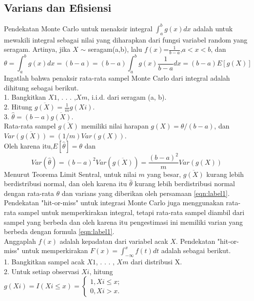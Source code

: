 \documentclass[a4paper,12pt]{article}
\theoremstyle{definition}
\begin{document}
\subsection{Varians dan Efisiensi}
Pendekatan Monte Carlo untuk menaksir integral $\int_{a}^{b}g(x)dx$ adalah untuk mewakili integral sebagai nilai yang diharapkan dari fungsi variabel random yang seragam.
Artinya, jika $X$ $\sim$ seragam(a,b), lalu $f(x)$=$\frac{1}{b-a}$,$a<x<b$, dan
\begin{equation}
    \theta=\int_{a}^{b}g(x)dx
    =(b-a)=(b-a)\int_{a}^{b}g(x)\frac{1}{b-a}dx=(b-a)E[g(X)]
\end{equation}
Ingatlah bahwa penaksir rata-rata sampel Monte Carlo dari integral adalah
dihitung sebagai berikut.\\
1. Bangkitkan $X1$, . . . ,$Xm$, i.i.d. dari seragam (a, b).\\
2. Hitung $\overline{g(X)}=\frac{1}{m}g(Xi)$.\\
3. $\hat{\theta}=(b-a)\overline{g(X)}$.\\
Rata-rata sampel $\overline{g(X)}$ memiliki nilai harapan $g(X)=\theta/(b-a)$, dan ${Var}\overline{(g(X))}=(1/m){Var}(g(X))$.\\
Oleh karena itu,$E[{\hat{\theta}}]=\theta$ dan
\begin{equation}
{Var(\hat{\theta})}=(b-a)^2{Var(\overline{g(X)})}=\frac{(b-a)^2}{m}{Var(g(X))}
\label{eqn:label1}
\end{equation}
Menurut Teorema Limit Sentral, untuk nilai $m$ yang besar, $\overline{g(X)}$ kurang lebih berdistribusi normal, dan oleh karena itu $\hat{\theta}$ kurang lebih berdistribusi normal dengan rata-rata $\theta$ dan varians yang diberikan oleh persamaan \eqref{eqn:label1}.\\
Pendekatan "hit-or-miss" untuk integrasi Monte Carlo juga menggunakan rata-rata sampel untuk memperkirakan integral, tetapi rata-rata sampel diambil dari sampel yang berbeda dan oleh karena itu pengestimasi ini memiliki varian yang berbeda dengan formula \eqref{eqn:label1}.\\
Anggaplah $f(x)$ adalah kepadatan dari variabel acak $X$. Pendekatan "hit-or-miss" untuk memperkirakan $F(x)=\int_{-\infty }^{x}f(t)dt$ adalah sebagai berikut.\\
1. Bangkitkan sampel acak $X1$, . . . , $Xm$ dari distribusi X.\\
2. Untuk setiap observasi $Xi$, hitung\\
$g(Xi)=I(Xi\leq x)=\left\{\begin{matrix}
1,   Xi\leq x;& \\ 
0,   Xi>x. & 
\end{matrix}\right.$\\
\end{document}
